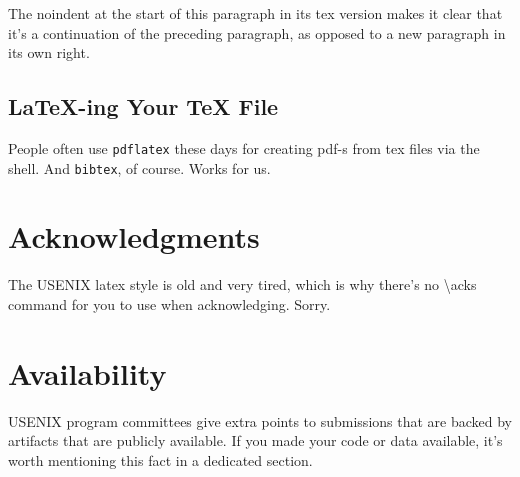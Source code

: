 \noindent
The noindent at the start of this paragraph in its tex version makes
it clear that it's a continuation of the preceding paragraph, as
opposed to a new paragraph in its own right.


\subsection{LaTeX-ing Your TeX File}

People often use \texttt{pdflatex} these days for creating pdf-s from
tex files via the shell. And \texttt{bibtex}, of course. Works for us.

\section*{Acknowledgments}

The USENIX latex style is old and very tired, which is why
there's no \textbackslash{}acks command for you to use when
acknowledging. Sorry.

\section*{Availability}

USENIX program committees give extra points to submissions that are
backed by artifacts that are publicly available. If you made your code
or data available, it's worth mentioning this fact in a dedicated
section.






